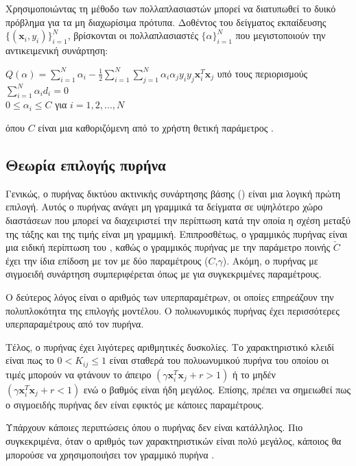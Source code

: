 Χρησιμοποιώντας τη μέθοδο των πολλαπλασιαστών  μπορεί να διατυπωθεί το δυικό πρόβλημα για τα μη διαχωρίσιμα πρότυπα. Δοθέντος του δείγματος εκπαίδευσης $\{(\mathbf{x}_i,y_i)\}_{i=1}^N$, βρίσκονται οι πολλαπλασιαστές  $\{\alpha\}_{i=1}^N$ που μεγιστοποιούν την αντικειμενική συνάρτηση:\\
\begin{center}
$Q(\alpha)=\sum_{i=1}^N\alpha_i-\frac{1}{2}\sum_{i=1}^N\sum_{j=1}^N\alpha_i\alpha_jy_iy_j\mathbf{x}_i^T\mathbf{x}_j$
υπό τους περιορισμούς
$\sum_{i=1}^N\alpha_i d_i=0$\\
$0 \leq \alpha_i \leq C$ για $i=1,2, ...,N$\\
\end{center}
όπου $C$ είναι μια καθοριζόμενη από το χρήστη θετική παράμετρος \cite{haykin}.
\subsection{Θεωρία επιλογής πυρήνα }
Γενικώς, ο πυρήνας δικτύου ακτινικής συνάρτησης βάσης () είναι μια λογική πρώτη επιλογή. Αυτός ο πυρήνας ανάγει μη γραμμικά τα δείγματα σε υψηλότερο χώρο διαστάσεων που μπορεί να διαχειριστεί την περίπτωση κατά την οποία η σχέση μεταξύ της τάξης και της τιμής είναι μη γραμμική. Επιπροσθέτως, ο γραμμικός πυρήνας είναι μια ειδική περίπτωση του , καθώς ο γραμμικός πυρήνας με την παράμετρο ποινής $\check{C}$ έχει την ίδια επίδοση με τον  με δύο παραμέτρους ($C$,$\gamma$). Ακόμη, ο πυρήνας με σιγμοειδή συνάρτηση συμπεριφέρεται όπως με  για συγκεκριμένες παραμέτρους.\par
Ο δεύτερος λόγος είναι ο αριθμός των υπερπαραμέτρων, οι οποίες επηρεάζουν την πολυπλοκότητα της επιλογής μοντέλου. Ο πολυωνυμικός πυρήνας έχει περισσότερες υπερπαραμέτρους από τον  πυρήνα.\par
Τέλος, ο πυρήνας  έχει λιγότερες αριθμητικές δυσκολίες. Το χαρακτηριστικό κλειδί είναι πως το $0<K_{ij}\leq1$ είναι σταθερά του πολυωνυμικού πυρήνα του οποίου οι τιμές μπορούν να φτάνουν το άπειρο $(\gamma\mathbf{x}_i^T\mathbf{x}_j+r>1)$ ή το μηδέν $(\gamma\mathbf{x}_i^T\mathbf{x}_j+r<1)$ ενώ ο βαθμός είναι ήδη μεγάλος. Επίσης, πρέπει να σημειωθεί πως ο σιγμοειδής πυρήνας δεν είναι εφικτός με κάποιες παραμέτρους.\par
Υπάρχουν κάποιες περιπτώσεις όπου ο πυρήνας  δεν είναι κατάλληλος. Πιο συγκεκριμένα, όταν ο αριθμός των χαρακτηριστικών είναι πολύ μεγάλος, κάποιος θα μπορούσε να χρησιμοποιήσει τον γραμμικό πυρήνα \cite{libsvmguide}.

